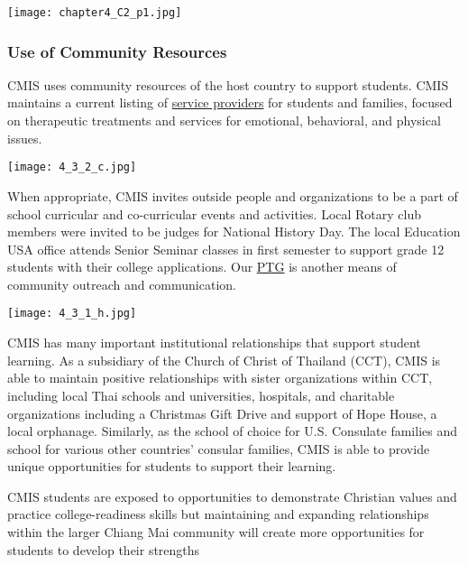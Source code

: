 {\centering\texttt{[image: chapter4\_C2\_p1.jpg]}}

\subsubsection{Use of Community Resources}



\begin{findings}
CMIS uses community resources of the host country to support students. CMIS maintains a current listing of \href{https://drive.google.com/drive/u/0/folders/0B_rFN7xA3AUNTC0yaWxCMEVYTkE}{service providers} for students and families, focused on therapeutic treatments and services for emotional, behavioral, and physical issues.

{\centering\texttt{[image: 4\_3\_2\_c.jpg]}}

When appropriate, CMIS invites outside people and organizations to be a part of school curricular and co-curricular events and activities.  Local Rotary club members were invited to be judges for National History Day.  The local Education USA office attends Senior Seminar classes in first semester to support grade 12 students with their college applications. Our \href{http://blogs.cmis.ac.th/ptg/}{PTG} is another means of community outreach and communication. 

{\centering\texttt{[image: 4\_3\_1\_h.jpg]}}

CMIS has many important institutional relationships that support student learning.  As a subsidiary of the Church of Christ of Thailand (CCT), CMIS is able to maintain positive relationships with sister organizations within CCT, including local Thai schools and universities, hospitals, and charitable organizations including a Christmas Gift Drive and support of Hope House, a local orphanage.  Similarly, as the school of choice for U.S. Consulate families and school for various other countries’ consular families, CMIS is able to provide unique opportunities for students to support their learning.


CMIS students are exposed to opportunities to demonstrate Christian values and practice college-readiness skills but maintaining and expanding relationships within the larger Chiang Mai community will create more opportunities for students to develop their strengths
\end{findings}

